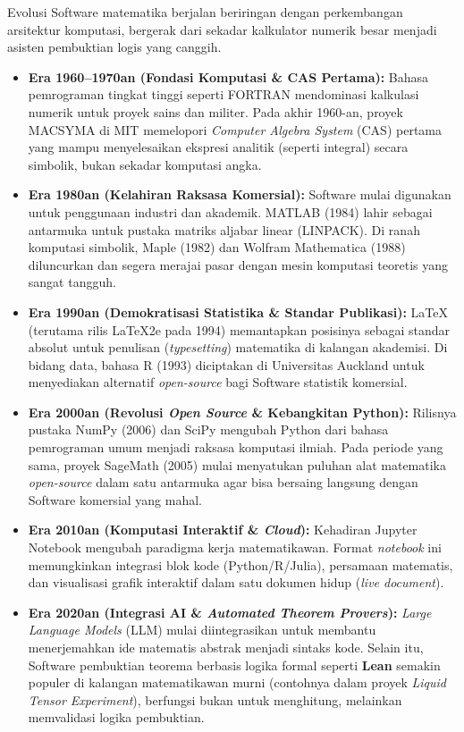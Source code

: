 \documentclass[11pt, a4paper, numbers=enddot, oneside]{scrbook}
\begin{document}
Evolusi Software matematika berjalan beriringan dengan perkembangan arsitektur komputasi, bergerak dari sekadar kalkulator numerik besar menjadi asisten pembuktian logis yang canggih.

\begin{itemize}
    \item \textbf{Era 1960–1970an (Fondasi Komputasi \& CAS Pertama):} Bahasa pemrograman tingkat tinggi seperti FORTRAN mendominasi kalkulasi numerik untuk proyek sains dan militer. Pada akhir 1960-an, proyek MACSYMA di MIT memelopori \emph{Computer Algebra System} (CAS) pertama yang mampu menyelesaikan ekspresi analitik (seperti integral) secara simbolik, bukan sekadar komputasi angka.
    \item \textbf{Era 1980an (Kelahiran Raksasa Komersial):} Software mulai digunakan untuk penggunaan industri dan akademik. MATLAB (1984) lahir sebagai antarmuka untuk pustaka matriks aljabar linear (LINPACK). Di ranah komputasi simbolik, Maple (1982) dan Wolfram Mathematica (1988) diluncurkan dan segera merajai pasar dengan mesin komputasi teoretis yang sangat tangguh.
    \item \textbf{Era 1990an (Demokratisasi Statistika \& Standar Publikasi):} LaTeX (terutama rilis LaTeX2e pada 1994) memantapkan posisinya sebagai standar absolut untuk penulisan (\emph{typesetting}) matematika di kalangan akademisi. Di bidang data, bahasa R (1993) diciptakan di Universitas Auckland untuk menyediakan alternatif \emph{open-source} bagi Software statistik komersial.
    \item \textbf{Era 2000an (Revolusi \emph{Open Source} \& Kebangkitan Python):} Rilisnya pustaka NumPy (2006) dan SciPy mengubah Python dari bahasa pemrograman umum menjadi raksasa komputasi ilmiah. Pada periode yang sama, proyek SageMath (2005) mulai menyatukan puluhan alat matematika \emph{open-source} dalam satu antarmuka agar bisa bersaing langsung dengan Software komersial yang mahal.
    \item \textbf{Era 2010an (Komputasi Interaktif \& \emph{Cloud}):} Kehadiran Jupyter Notebook mengubah paradigma kerja matematikawan. Format \emph{notebook} ini memungkinkan integrasi blok kode (Python/R/Julia), persamaan matematis, dan visualisasi grafik interaktif dalam satu dokumen hidup (\emph{live document}).
    \item \textbf{Era 2020an (Integrasi AI \& \emph{Automated Theorem Provers}):} \emph{Large Language Models} (LLM) mulai diintegrasikan untuk membantu menerjemahkan ide matematis abstrak menjadi sintaks kode. Selain itu, Software pembuktian teorema berbasis logika formal seperti \textbf{Lean} semakin populer di kalangan matematikawan murni (contohnya dalam proyek \emph{Liquid Tensor Experiment}), berfungsi bukan untuk menghitung, melainkan memvalidasi logika pembuktian.
\end{itemize}
\end{document}
